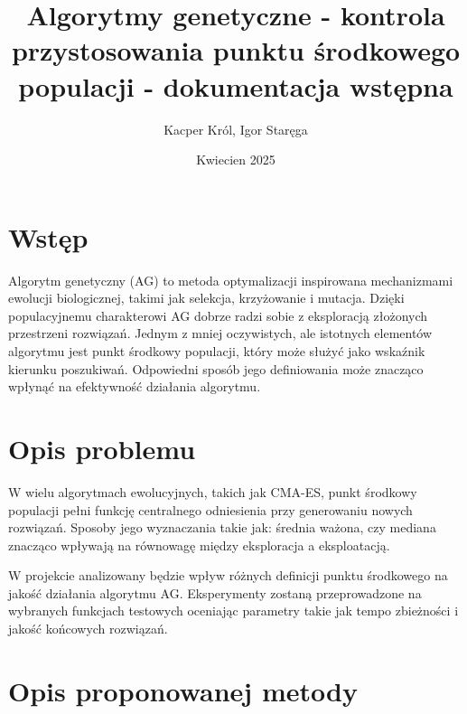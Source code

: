 \documentclass{article}
\title{Algorytmy genetyczne - kontrola przystosowania punktu środkowego populacji - dokumentacja wstępna}
\author{Kacper Król, Igor Staręga}
\date{Kwiecien 2025}
\begin{document}
\maketitle

\section{Wstęp}

Algorytm genetyczny (AG) to metoda optymalizacji inspirowana mechanizmami ewolucji biologicznej, takimi jak selekcja, krzyżowanie i mutacja. Dzięki populacyjnemu charakterowi AG dobrze radzi sobie z eksploracją złożonych przestrzeni rozwiązań. Jednym z mniej oczywistych, ale istotnych elementów algorytmu jest punkt środkowy populacji, który może służyć jako wskaźnik kierunku poszukiwań. Odpowiedni sposób jego definiowania może znacząco wpłynąć na efektywność działania algorytmu.


\section{Opis problemu}

W wielu algorytmach ewolucyjnych, takich jak CMA-ES, punkt środkowy populacji pełni funkcję centralnego odniesienia przy generowaniu nowych rozwiązań. Sposoby jego wyznaczania takie jak: średnia ważona, czy mediana znacząco wpływają na równowagę między eksploracja a eksploatacją.

W projekcie analizowany będzie wpływ różnych definicji punktu środkowego na jakość działania algorytmu AG. Eksperymenty zostaną przeprowadzone na wybranych funkcjach testowych oceniając parametry takie jak tempo zbieżności i jakość końcowych rozwiązań. 


\section{Opis proponowanej metody}
\end{document}
